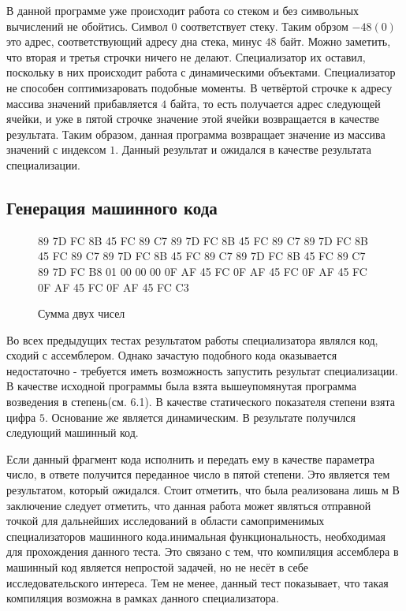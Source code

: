 \documentclass{spbau-diploma}
\begin{document}
В данной программе уже происходит работа со стеком и без символьных вычислений не обойтись. Символ $0$ соответствует стеку. Таким обрзом $-48(0)$ это адрес, соответствующий адресу дна стека, минус $48$ байт. Можно заметить, что вторая и третья строчки ничего не делают. Специализатор их оставил, поскольку в них происходит работа с динамическими объектами. Специализатор не способен соптимизаровать подобные моменты. В четвёртой строчке к адресу массива значений прибавляется $4$ байта, то есть получается адрес следующей ячейки, и уже в пятой строчке значение этой ячейки возвращается в качестве результата. Таким образом, данная программа возвращает значение из массива значений с индексом $1$. Данный результат и ожидался в качестве результата специализации.

\subsection{ Генерация машинного кода}

\begin{wrapfigure}{r}{0.5\textwidth}
89 7D FC 8B 45 FC 89 C7 89 7D FC 8B 45 FC 89 C7 89 7D FC 8B 45 FC 89 C7 89 7D FC 8B 45 FC 89 C7 89 7D FC 8B 45 FC 89 C7 89 7D FC B8 01 00 00 00 0F AF 45 FC 0F AF 45 FC 0F AF 45 FC 0F AF 45 FC 0F AF 45 FC C3
\caption{ Сумма двух чисел}
\label{fig:add}
\end{wrapfigure}
Во всех предыдущих тестах результатом работы специализатора являлся код, сходий с ассемблером. Однако зачастую подобного кода оказывается недостаточно - требуется иметь возможность запустить результат специализации. В качестве исходной программы была взята вышеупомянутая программа возведения в степень(см. 6.1). В качестве статического показателя степени взята цифра $5$. Основание же является динамическим. В результате получился следующий машинный код.

Если данный фрагмент кода исполнить и передать ему в качестве параметра число, в ответе получится переданное число в пятой степени. Это является тем результатом, который ожидался. Стоит отметить, что была реализована лишь м
В заключение следует отметить, что данная работа может являться отправной точкой для дальнейших исследований в области самоприменимых специализаторов машинного кода.инимальная функциональность, необходимая для прохождения данного теста. Это связано с тем, что компиляция ассемблера в машинный код является непростой задачей, но не несёт в себе исследовательского интереса. Тем не менее, данный тест показывает, что такая компиляция возможна в рамках данного специализатора.
\end{document}
